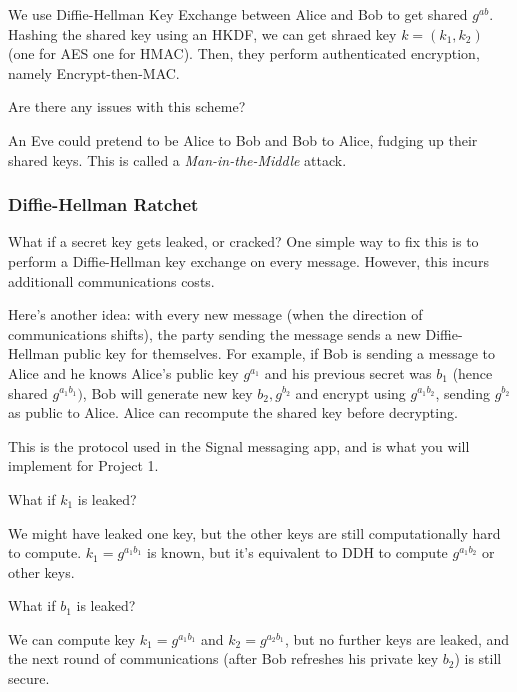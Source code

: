 We use Diffie-Hellman Key Exchange between Alice and Bob to get shared $g^{ab}$. Hashing the shared key using an HKDF, we can get shraed key $k = (k_1, k_2)$ (one for AES one for HMAC). Then, they perform authenticated encryption, namely Encrypt-then-MAC.

\begin{ques*}
    Are there any issues with this scheme?
\end{ques*}
An Eve could pretend to be Alice to Bob and Bob to Alice, fudging up their shared keys. This is called a \emph{Man-in-the-Middle} attack.

\subsubsection{Diffie-Hellman Ratchet}
What if a secret key gets leaked, or cracked? One simple way to fix this is to perform a Diffie-Hellman key exchange on every message. However, this incurs additionall communications costs.

Here's another idea: with every new message (when the direction of communications shifts), the party sending the message sends a new Diffie-Hellman public key for themselves. For example, if Bob is sending a message to Alice and he knows Alice's public key $g^{a_1}$ and his previous secret was $b_1$ (hence shared $g^{a_1b_1})$, Bob will generate new key $b_2, g^{b_2}$ and encrypt using $g^{a_1b_2}$, sending $g^{b_2}$ as public to Alice. Alice can recompute the shared key before decrypting.


This is the protocol used in the Signal messaging app, and is what you will implement for Project 1.

\begin{ques*}
    What if $k_1$ is leaked?
\end{ques*}
We might have leaked one key, but the other keys are still computationally hard to compute. $k_1=g^{a_1b_1}$ is known, but it's equivalent to DDH to compute $g^{a_1b_2}$ or other keys.

\begin{ques*}
    What if $b_1$ is leaked?
\end{ques*}
We can compute key $k_1=g^{a_1b_1}$ and $k_2=g^{a_2b_1}$, but no further keys are leaked, and the next round of communications (after Bob refreshes his private key $b_2$) is still secure.

